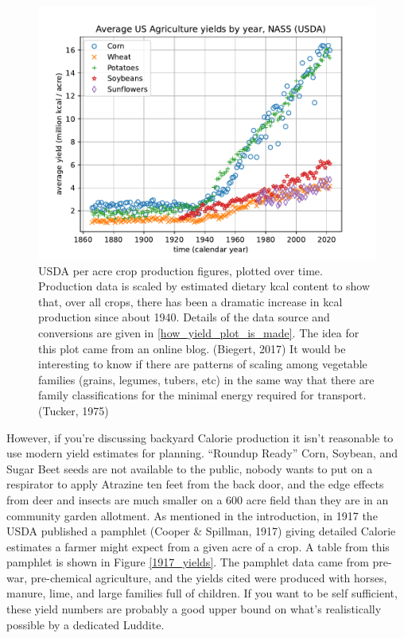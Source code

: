\documentclass[man]{apa7}
\begin{document}
\begin{figure}[ht!]
\centering
\includegraphics[width=\columnwidth]{kcal_per_acre_yields.pdf}
\caption{
USDA per acre crop production figures, plotted over time.  Production data is scaled by estimated dietary kcal content to show that, over all crops, there has been a dramatic increase in kcal production since about 1940.  
Details of the data source and conversions are given in \ref{how_yield_plot_is_made}.
The idea for this plot came from an online blog. (Biegert, 2017)
It would be interesting to know if there are patterns of scaling among vegetable families (grains, legumes, tubers, etc) in the same way that there are family classifications for the minimal energy required for transport. (Tucker, 1975)
}
\label{ag_yields}
\end{figure}

However, if you're discussing backyard Calorie production it isn't reasonable to use modern yield estimates for planning.  ``Roundup Ready'' Corn, Soybean, and Sugar Beet seeds are not available to the public, nobody wants to put on a respirator to apply Atrazine ten feet from the back door,  and the edge effects from deer and insects are much smaller on a $600$ acre field than they are in an community garden allotment.  As mentioned in the introduction, in 1917 the USDA published a pamphlet (Cooper \& Spillman, 1917) giving detailed Calorie estimates a farmer might expect from a given acre of a crop.  A table from this pamphlet is shown in Figure \ref{1917_yields}.  
The pamphlet data came from pre-war, pre-chemical agriculture, and the yields cited were produced with horses, manure, lime, and large families full of children.  If you want to be self sufficient, these yield numbers are probably a good upper bound on what's realistically possible by a dedicated Luddite.  
\end{document}
